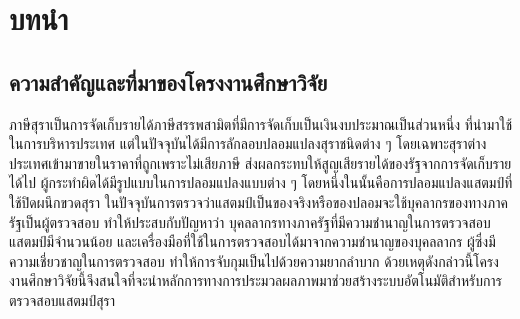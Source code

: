 \chapter{บทนำ}
\label{ch:intro}
\section{ความสำคัญและที่มาของโครงงานศึกษาวิจัย }
ภาษีสุราเป็นการจัดเก็บรายได้ภาษีสรรพสามิตที่มีการจัดเก็บเป็นเงินงบประมาณเป็นส่วนหนึ่ง
ที่นำมาใช้ในการบริหารประเทศ   แต่ในปัจจุบันได้มีการลักลอบปลอมแปลงสุราชนิดต่าง ๆ  โดยเฉพาะสุราต่างประเทศเข้ามาขายในราคาที่ถูกเพราะไม่เสียภาษี ส่งผลกระทบให้สูญเสียรายได้ของรัฐจากการจัดเก็บรายได้ไป ผู้กระทำผิดได้มีรูปแบบในการปลอมแปลงแบบต่าง ๆ โดยหนึ่งในนั้นคือการปลอมแปลงแสตมป์ที่ใช้ปิดผนึกขวดสุรา ในปัจจุบันการตรวจว่าแสตมป์เป็นของจริงหรือของปลอมจะใช้บุคลากรของทางภาครัฐเป็นผู้ตรวจสอบ 
ทำให้ประสบกับปัญหาว่า บุคลลากรทางภาครัฐที่มีความชำนาญในการตรวจสอบแสตมป์มีจำนวนน้อย และเครื่องมือที่ใช้ในการตรวจสอบได้มาจากความชำนาญของบุคลลากร ผู้ซึ่งมีความเชี่ยวชาญในการตรวจสอบ  ทำให้การจับกุมเป็นไปด้วยความยากลำบาก  
 ด้วยเหตุดังกล่าวนี้โครงงานศึกษาวิจัยนี้จึงสนใจที่จะนำหลักการทางการประมวลผลภาพมาช่วยสร้างระบบอัตโนมัติสำหรับการตรวจสอบแสตมป์สุรา  

